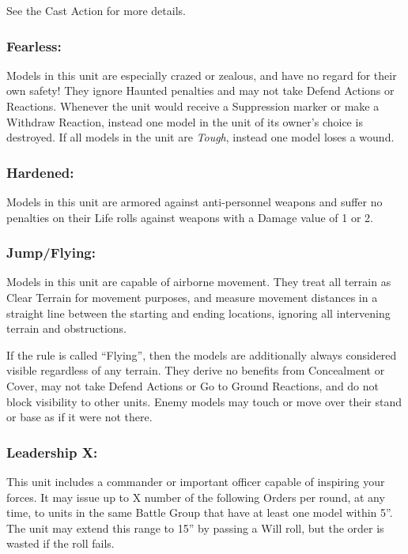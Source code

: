 \begin{multicols}{2}
See the Cast Action for more details.

\subsubsection*{Fearless:} Models in this unit are especially crazed or zealous, and have no regard for their own safety! They ignore Haunted penalties and may not take Defend Actions or Reactions. Whenever the unit would receive a Suppression marker or make a Withdraw Reaction, instead one model in the unit of its owner's choice is destroyed. If all models in the unit are \textit{Tough}, instead one model loses a wound.

\subsubsection*{Hardened:} Models in this unit are armored against anti-personnel weapons and suffer no penalties on their Life rolls against weapons with a Damage value of 1 or 2.

\subsubsection*{Jump/Flying:} Models in this unit are capable of airborne movement. They treat all terrain as Clear Terrain for movement purposes, and measure movement distances in a straight line between the starting and ending locations, ignoring all intervening terrain and obstructions.

If the rule is called ``Flying'', then the models are additionally always considered visible regardless of any terrain. They derive no benefits from Concealment or Cover, may not take Defend Actions or Go to Ground Reactions, and do not block visibility to other units. Enemy models may touch or move over their stand or base as if it were not there.

\subsubsection*{Leadership X:} This unit includes a commander or important officer capable of inspiring your forces. It may issue up to X number of the following Orders per round, at any time, to units in the same Battle Group that have at least one model within 5''. The unit may extend this range to 15'' by passing a Will roll, but the order is wasted if the roll fails.


\end{multicols}
